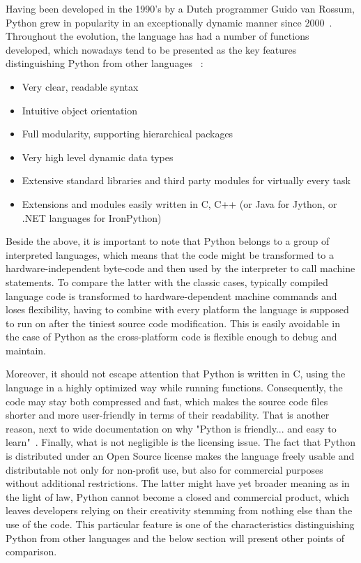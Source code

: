Having been developed in the 1990's by a Dutch programmer Guido van Rossum, Python grew in popularity in an exceptionally dynamic manner since 2000~\cite{py_code_swarm}. Throughout the evolution, the language has had a number of functions developed, which nowadays tend to be presented as the key features distinguishing Python from other languages ~\cite{py_about}:
\begin{itemize}
\item{Very clear, readable syntax}
\item{Intuitive object orientation}
\item{Full modularity, supporting hierarchical packages}
\item{Very high level dynamic data types}
\item{Extensive standard libraries and third party modules for virtually every task}
\item{Extensions and modules easily written in C, C++ (or Java for Jython, or .NET languages for IronPython)}
\end{itemize}
Beside the above, it is important to note that Python belongs to a group of interpreted languages, which means that the code might be transformed to a hardware-independent byte-code and then used by the interpreter to call machine statements. To compare the latter with the classic cases, typically compiled language code is transformed to hardware-dependent machine commands and loses flexibility, having to combine with every platform the language is supposed to run on after the tiniest source code modification. This is easily avoidable in the case of Python as the cross-platform code is flexible enough to debug and maintain. 

Moreover, it should not escape attention that Python is written in C, using the language in a highly optimized way while running functions. Consequently, the code may stay both compressed and fast, which makes the source code files shorter and more user-friendly in terms of their readability. That is another reason, next to wide documentation on why "Python is friendly... and easy to learn"~\cite{py_about}. Finally, what is not negligible is the licensing issue. The fact that Python is distributed under an Open Source license makes the language freely usable and distributable not only for non-profit use, but also for commercial purposes without additional restrictions. The latter might have yet broader meaning as in the light of law, Python cannot become a closed and commercial product, which leaves developers relying on their creativity stemming from nothing else than the use of the code. This particular feature is one of the characteristics distinguishing Python from other languages and the below section will present other points of comparison.

